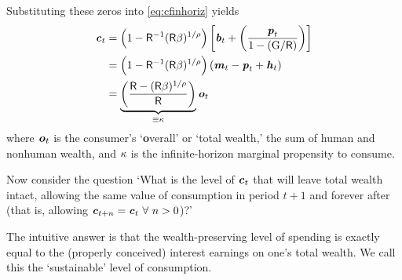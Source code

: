 \documentclass{scrartcl}
\begin{document}
Substituting these zeros into \eqref{eq:cfinhoriz} yields 
\begin{equation}\begin{gathered}\begin{aligned}
        \cLvl_{t} & =  \left(1-\Rfree^{-1}(\Rfree\DiscFac)^{1/\CRRA}\right)\left[\bLvl_{t}+\left(\frac{\pLvl_{t}}{1-({\WGroFac}/\Rfree)}\right)\right] %
\\      & =  \left(1-\Rfree^{-1}(\Rfree\DiscFac)^{1/\CRRA}\right)\left(\mLvl_{t}-\pLvl_{t}+\hLvl_{t}\right)  %
\\      & =  \underbrace{\left(\frac{\Rfree -(\Rfree\DiscFac)^{1/\CRRA}}{\Rfree}\right)}_{ \equiv \MPC} \oLvl_{t} \label{eq:cOfw}
\end{aligned}\end{gathered}\end{equation}
where $\boldsymbol{\mathit{o}}_{t}$ is the consumer's `\textbf{o}verall' or `total wealth,' the sum of human and 
nonhuman wealth, and $\kappa$ is the infinite-horizon marginal propensity to consume.

Now consider the question `What is the level of $\boldsymbol{\mathit{c}}_{t}$ that will 
leave total wealth intact, allowing the same value of consumption in 
period $t+1$ and forever after (that is, allowing $\boldsymbol{\mathit{c}}_{t+n}=\boldsymbol{\mathit{c}}_{t}~\forall~n>0$)?'  

The intuitive answer is that the wealth-preserving level of spending is exactly equal to the
(properly conceived) interest earnings on one's total
wealth.
We call this the `sustainable' level of consumption.
\end{document}
